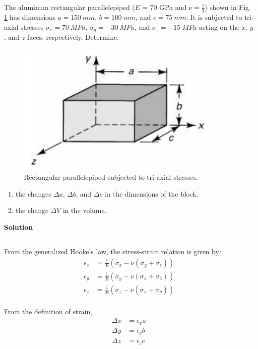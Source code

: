 \section{}
The aluminum rectangular parallelepiped ($E$ = 70 GPa and $\nu = \frac{1}{3}$) shown in Fig. \ref{fig:Q2} has dimensions 
$a = \qty{150}{mm}$, $b = \qty{100}{mm}$, and $c = \qty{75}{mm}$. It is subjected to tri-axial stresses 
$\sigma_x = \qty{70}{MPa}$, $\sigma_y = \qty{-30}{MPa}$, and $\sigma_z = \qty{-15}{MPa}$ acting on the 
$x$, $y$, and $z$ faces, respectively. Determine,

\begin{figure}[h]
    \centering
    \includegraphics[width=0.5\linewidth]{Questions/Figures/Q2ProblemDiagram.png}
    \caption{Rectangular parallelepiped subjected to tri-axial stresses.}
    \label{fig:Q2}
\end{figure}

\begin{enumerate}[label=(\alph*)]
    \item the changes $\Delta a$, $\Delta b$, and $\Delta c$ in the dimensions of the block.
    \item the change $\Delta V$ in the volume.
\end{enumerate}


\textbf{Solution}
\subsection{}
From the generalized Hooke's law, the stress-strain relation is given by:
\[
\begin{aligned}
    \epsilon_x &= \frac{1}{E} (\sigma_x - \nu(\sigma_y + \sigma_z)) \\
    \epsilon_y &= \frac{1}{E} (\sigma_y - \nu(\sigma_x + \sigma_z)) \\
    \epsilon_z &= \frac{1}{E} (\sigma_z - \nu(\sigma_x + \sigma_y)) \\
\end{aligned}
\]

From the definition of strain,
\[
\begin{aligned}
    \Delta x &= \epsilon_x a \\
    \Delta y &= \epsilon_y b \\
    \Delta z &= \epsilon_z c \\
\end{aligned}
\]

